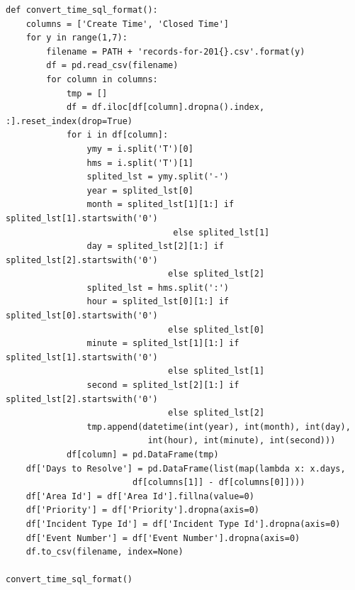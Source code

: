 \documentclass{article} %
\begin{document}
\lstset{language=python}
\lstset{frame=lines}
\lstset{basicstyle=\footnotesize}
\begin{lstlisting}
def convert_time_sql_format():
    columns = ['Create Time', 'Closed Time']
    for y in range(1,7):
    	filename = PATH + 'records-for-201{}.csv'.format(y)
    	df = pd.read_csv(filename)
    	for column in columns:
    		tmp = []
    		df = df.iloc[df[column].dropna().index, :].reset_index(drop=True)
    		for i in df[column]:
    			ymy = i.split('T')[0]
    			hms = i.split('T')[1]
    			splited_lst = ymy.split('-')
    			year = splited_lst[0]
    			month = splited_lst[1][1:] if splited_lst[1].startswith('0')
    							 else splited_lst[1]
    			day = splited_lst[2][1:] if splited_lst[2].startswith('0')
    							else splited_lst[2]
    			splited_lst = hms.split(':')
    			hour = splited_lst[0][1:] if splited_lst[0].startswith('0')
    							else splited_lst[0]
    			minute = splited_lst[1][1:] if splited_lst[1].startswith('0')
    							else splited_lst[1]
    			second = splited_lst[2][1:] if splited_lst[2].startswith('0')
    							else splited_lst[2]
    			tmp.append(datetime(int(year), int(month), int(day),
    						int(hour), int(minute), int(second)))
    		df[column] = pd.DataFrame(tmp)
	df['Days to Resolve'] = pd.DataFrame(list(map(lambda x: x.days,
						 df[columns[1]] - df[columns[0]])))
	df['Area Id'] = df['Area Id'].fillna(value=0)
	df['Priority'] = df['Priority'].dropna(axis=0)
	df['Incident Type Id'] = df['Incident Type Id'].dropna(axis=0)
	df['Event Number'] = df['Event Number'].dropna(axis=0)
	df.to_csv(filename, index=None)
	
convert_time_sql_format()
\end{lstlisting}
\end{document}
